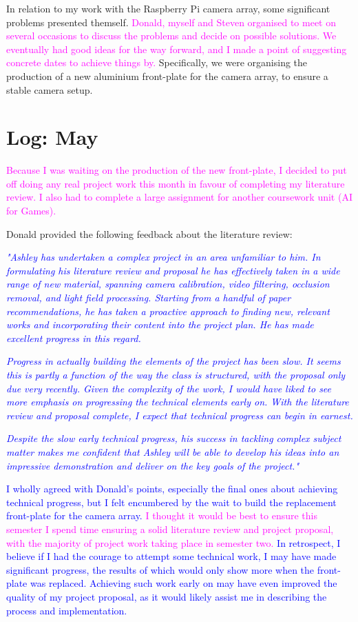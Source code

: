 \documentclass[a4paper, 12pt]{article}
\begin{document}
In relation to my work with the Raspberry Pi camera array, some significant problems presented themself. \textcolor{Magenta}{Donald, myself and Steven organised to meet on several occasions to discuss the problems and decide on possible solutions. We eventually had good ideas for the way forward, and I made a point of suggesting concrete dates to achieve things by.} Specifically, we were organising the production of a new aluminium front-plate for the camera array, to ensure a stable camera setup.

\newpage
\section{Log: May}
\textcolor{Magenta}{Because I was waiting on the production of the new front-plate, I decided to put off doing any real project work this month in favour of completing my literature review. I also had to complete a large assignment for another coursework unit (AI for Games).}

Donald provided the following feedback about the literature review: 

\textcolor{Blue}{\emph{"Ashley has undertaken a complex project in an area unfamiliar to him. In formulating his literature review and proposal he has effectively taken in a wide range of new material, spanning camera calibration, video filtering, occlusion removal, and light field processing. Starting from a handful of paper recommendations, he has taken a proactive approach to finding new, relevant works and incorporating their content into the project plan. He has made excellent progress in this regard.}}

\textcolor{Blue}{\emph{Progress in actually building the elements of the project has been slow. It seems this is partly a function of the way the class is structured, with the proposal only due very recently. Given the complexity of the work, I would have liked to see more emphasis on progressing the technical elements early on. With the literature review and proposal complete, I expect that technical progress can begin in earnest.}}

\textcolor{Blue}{\emph{Despite the slow early technical progress, his success in tackling complex subject matter makes me confident that Ashley will be able to develop his ideas into an impressive demonstration and deliver on the key goals of the project."}}

\textcolor{Blue}{I wholly agreed with Donald's points, especially the final ones about achieving technical progress, but I felt encumbered by the wait to build the replacement front-plate for the camera array.} \textcolor{Magenta}{I thought it would be best to ensure this semester I spend time ensuring a solid literature review and project proposal, with the majority of project work taking place in semester two.} \textcolor{Blue}{In retrospect, I believe if I had the courage to attempt some technical work, I may have made significant progress, the results of which would only show more when the front-plate was replaced. Achieving such work early on may have even improved the quality of my project proposal, as it would likely assist me in describing the process and implementation.}
\end{document}
